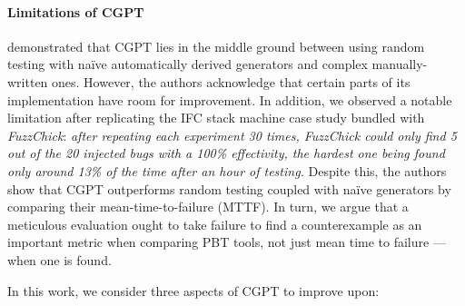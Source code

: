 \documentclass[sigconf,review,anonymous]{acmart}
\newcommand{\fuzzchick}{\textit{FuzzChick}\xspace}
\begin{document}
%
%
\paragraph{Limitations of CGPT}

\citeauthor{lampropoulos2019coverage} demonstrated that CGPT lies in the middle
ground between using random testing with na\"ive automatically derived
generators and complex manually-written ones.
%
%
However, the authors acknowledge that certain parts of its implementation have
room for improvement. 
%
%
In addition, we observed a notable limitation after replicating the IFC stack
machine case study bundled with \fuzzchick:
%
\emph{after repeating each experiment 30 times, \fuzzchick could only find 5 out
  of the 20 injected bugs with a 100\% effectivity, the hardest one being found
  only around 13\% of the time after an hour of testing.}
%
Despite this, the authors show that CGPT outperforms random testing coupled with
na\"ive generators by comparing their mean-time-to-failure (MTTF).
%
In turn, we argue that a meticulous evaluation ought to take failure to find a
counterexample as an important metric when comparing PBT tools, not just mean
time to failure --- when one is found.
%

In this work, we consider three aspects of CGPT to improve upon:
%
%
%
%
\end{document}
